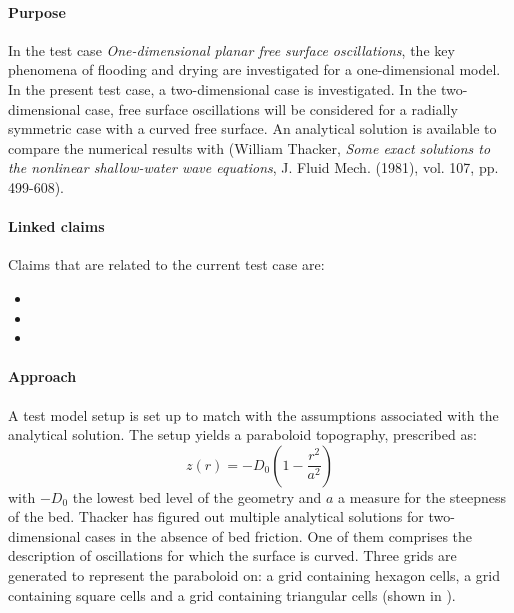

\paragraph*{Purpose}
In the test case \emph{One-dimensional planar free surface oscillations}, the key phenomena of flooding and drying are investigated for a one-dimensional model. In the present test case, a two-dimensional case is investigated. In the two-dimensional case, free surface oscillations will be considered for a radially symmetric case with a curved free surface. An analytical solution is available to compare the numerical results with (William Thacker, \emph{Some exact solutions to the nonlinear shallow-water wave equations}, J. Fluid Mech. (1981), vol. 107, pp. 499-608).



\paragraph*{Linked claims}
Claims that are related to the current test case are:
\begin{itemize}
\item {}
\item {}
\item {}
\end{itemize}

\paragraph*{Approach}
A test model setup is set up to match with the assumptions associated with the analytical solution. The setup yields a paraboloid topography, prescribed as:
\begin{equation*}
z(r)  =  -D_0 \left(1 - \frac{r^2}{a^2}  \right)
\end{equation*}
with $-D_0$ the lowest bed level of the geometry and $a$ a measure for the steepness of the bed. Thacker has figured out multiple analytical solutions for two-dimensional cases in the absence of bed friction. One of them comprises the description of oscillations for which the surface is curved. Three grids are generated to represent the paraboloid on: a grid containing hexagon cells, a grid containing square cells and a grid containing triangular cells (shown in ).

